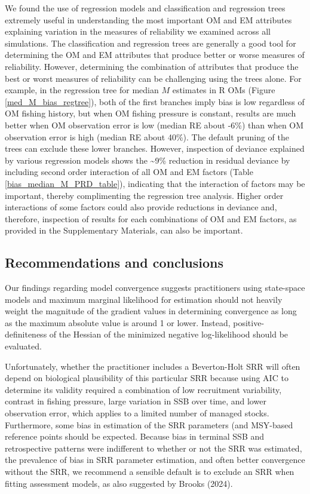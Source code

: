\documentclass[
  12pt,
]{article}
\begin{document}
We found the use of regression models and classification and regression
trees extremely useful in understanding the most important OM and EM
attributes explaining variation in the measures of reliability we
examined across all simulations. The classification and regression trees
are generally a good tool for determining the OM and EM attributes that
produce better or worse measures of reliability. However, determining
the combination of attributes that produce the best or worst measures of
reliability can be challenging using the trees alone. For example, in
the regression tree for median \(M\) estimates in R OMs (Figure
\ref{med_M_bias_regtree}), both of the first branches imply bias is low
regardless of OM fishing history, but when OM fishing pressure is
constant, results are much better when OM observation error is low
(median RE about -6\%) than when OM observation error is high (median RE
about 40\%). The default pruning of the trees can exclude these lower
branches. However, inspection of deviance explained by various
regression models shows the \textasciitilde9\% reduction in residual
deviance by including second order interaction of all OM and EM factors
(Table \ref{bias_median_M_PRD_table}), indicating that the interaction
of factors may be important, thereby complimenting the regression tree
analysis. Higher order interactions of some factors could also provide
reductions in deviance and, therefore, inspection of results for each
combinations of OM and EM factors, as provided in the Supplementary
Materials, can also be important.

\subsection*{Recommendations and
conclusions}\label{recommendations-and-conclusions}

Our findings regarding model convergence suggests practitioners using
state-space models and maximum marginal likelihood for estimation should
not heavily weight the magnitude of the gradient values in determining
convergence as long as the maximum absolute value is around 1 or lower.
Instead, positive-definiteness of the Hessian of the minimized negative
log-likelihood should be evaluated.

Unfortunately, whether the practitioner includes a Beverton-Holt SRR
will often depend on biological plausibility of this particular SRR
because using AIC to determine its validity required a combination of
low recruitment variability, contrast in fishing pressure, large
variation in SSB over time, and lower observation error, which applies
to a limited number of managed stocks. Furthermore, some bias in
estimation of the SRR parameters (and MSY-based reference points should
be expected. Because bias in terminal SSB and retrospective patterns
were indifferent to whether or not the SRR was estimated, the prevalence
of bias in SRR parameter estimation, and often better convergence
without the SRR, we recommend a sensible default is to exclude an SRR
when fitting assessment models, as also suggested by Brooks (2024).
\end{document}
